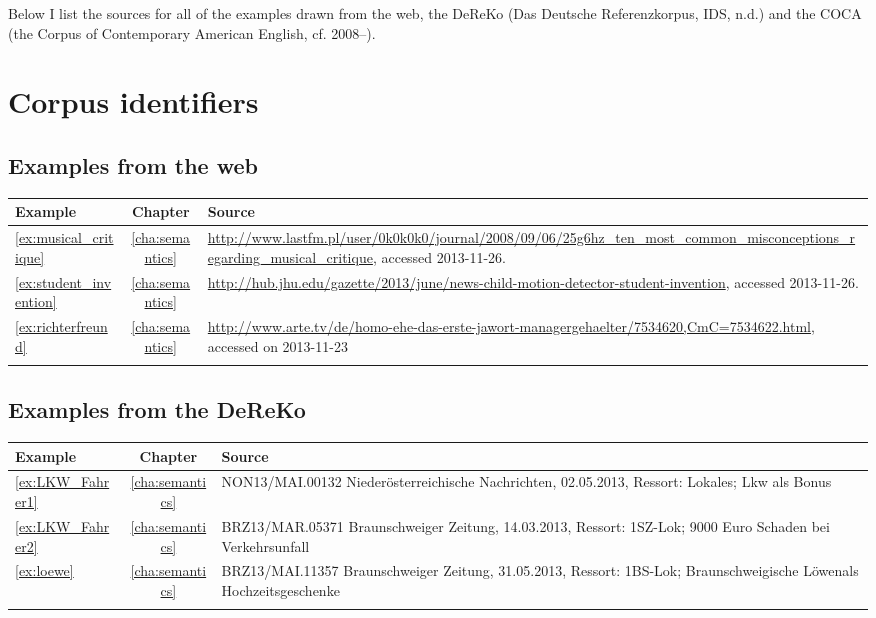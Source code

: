 Below I list the sources for all of the examples drawn from the web, the DeReKo (Das Deutsche Referenzkorpus, IDS, n.d.) and the COCA (the Corpus of Contemporary American English, cf.
\citeauthor{COCA} 2008--).
\nocite{DeReKo}
\section{Corpus identifiers}

\subsection{Examples from the web}
\begin{longtable}{lcp{8.5cm}}\lsptoprule
Example&Chapter&Source\\\midrule
\ref{ex:musical_critique}&\ref{cha:semantics}&\url{http://www.lastfm.pl/user/0k0k0k0/journal/2008/09/06/25g6hz_ten_most_common_misconceptions_regarding_musical_critique},  accessed 2013-11-26.\\
\ref{ex:student_invention}&\ref{cha:semantics}&\url{http://hub.jhu.edu/gazette/2013/june/news-child-motion-detector-student-invention}, accessed 2013-11-26.\\
\ref{ex:richterfreund}&\ref{cha:semantics}&\url{http://www.arte.tv/de/homo-ehe-das-erste-jawort-managergehaelter/7534620,CmC=7534622.html}, accessed on 2013-11-23\\\lspbottomrule
\end{longtable}

\subsection{Examples from the DeReKo}

\begin{longtable}{lcp{8.5cm}}\lsptoprule
Example&Chapter&Source\\\midrule
\ref{ex:LKW_Fahrer1}&\ref{cha:semantics}&NON13/MAI.00132 Niederösterreichische Nachrichten, 02.05.2013, Ressort: Lokales; Lkw als Bonus\\
\ref{ex:LKW_Fahrer2}&\ref{cha:semantics}&BRZ13/MAR.05371 Braunschweiger Zeitung, 14.03.2013, Ressort: 1SZ-Lok; 9000 Euro Schaden bei Verkehrsunfall\\
\ref{ex:loewe}&\ref{cha:semantics}&BRZ13/MAI.11357 Braunschweiger Zeitung, 31.05.2013, Ressort: 1BS-Lok; Braunschweigische Löwenals Hochzeitsgeschenke\\\lspbottomrule
\end{longtable}
